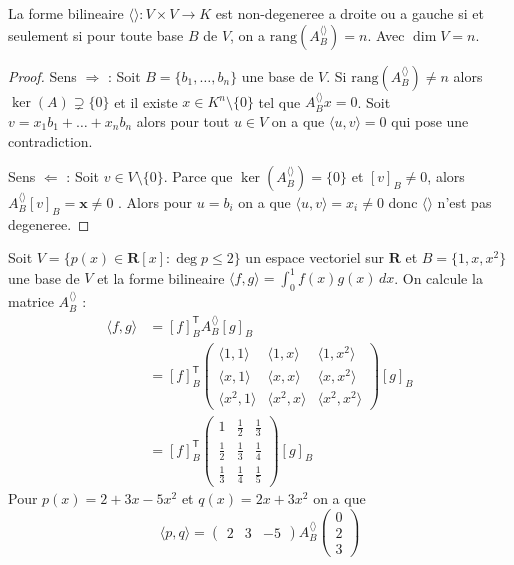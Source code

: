 \begin{theorem}
La forme bilineaire $\langle  \rangle:V\times V\to K$ est non-degeneree a droite ou a gauche si et seulement si pour toute base $B$ de $V$, on a $\mathrm{rang}(A_{B}^{\langle  \rangle})=n$. Avec $\dim V=n$.
\end{theorem}
\begin{proof}
Sens $\Rightarrow$ : Soit $B=\{ b_{1},\dots,b_{n} \}$ une base de $V$. Si $\mathrm{rang}(A_{B}^{\langle  \rangle})\neq n$ alors $\ker(A)\supsetneq \{ 0 \}$ et il existe $x \in K^{n}\setminus \{ 0 \}$ tel que $A_{B}^{\langle  \rangle}x=0$. Soit $v=x_{1}b_{1}+\dots +x_{n}b_{n}$ alors pour tout $u\in V$ on a que $\langle u,v \rangle=0$ qui pose une contradiction.

Sens $\Leftarrow$ : Soit $v\in V\setminus \{ 0 \}$. Parce que $\ker(A_{B}^{\langle  \rangle})=\{ 0 \}$ et $[v]_{B}\neq 0$, alors $A_{B}^{\langle  \rangle}[v]_{B}=\boldsymbol{x}\neq 0$ . Alors pour $u=b_{i}$ on a que $\langle u,v \rangle=x_{i}\neq 0$ donc $\langle  \rangle$ n'est pas degeneree.
\end{proof}
\begin{example}
Soit $V=\{ p(x)\in \mathbf{R}[x]:\deg p \le 2 \}$ un espace vectoriel sur $\mathbf{R}$ et $B=\{ 1,x,x^{2} \}$ une base de $V$ et la forme bilineaire $\langle f,g \rangle=\int_{0}^{1} f(x)g(x) \, dx$. On calcule la matrice $A_{B}^{\langle  \rangle}$ :
\begin{align*}
 \langle f,g \rangle  & =[f]_{B}^{\mathsf{T}}A_{B}^{\langle  \rangle }[g]_{B} \\
 & =[f]_{B}^{\mathsf{T}}\begin{pmatrix}
\langle 1 ,1 \rangle & \langle 1,x \rangle  & \langle 1,x^{2} \rangle \\
\langle x,1 \rangle  & \langle x,x \rangle  & \langle x,x^{2} \rangle  \\
\langle x^{2},1 \rangle  & \langle x^{2},x \rangle  & \langle x^{2},x^{2} \rangle  
\end{pmatrix} [g]_{B} \\
 & =[f]_{B}^{\mathsf{T}}\begin{pmatrix}
1 & \frac{1}{2} & \frac{1}{3} \\
\frac{1}{2} & \frac{1}{3} &  \frac{1}{4} \\
\frac{1}{3} & \frac{1}{4} &  \frac{1}{5}
\end{pmatrix}[g]_{B}
\end{align*}
Pour $p(x)=2+3x-5x^{2}$ et $q(x)=2x+3x^{2}$ on a que 
$$
\langle p,q \rangle =\begin{pmatrix}
2 & 3 & -5
\end{pmatrix}A_{B}^{\langle  \rangle }\begin{pmatrix}
0 \\
2 \\
3
\end{pmatrix}
$$
\end{example}